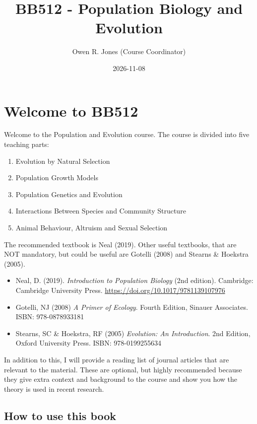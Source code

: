 \documentclass[
  a4paper]{book}
\title{BB512 - Population Biology and Evolution}
\author{Owen R. Jones (Course Coordinator)}
\date{2026-11-08}
\providecommand{\tightlist}{%
  \setlength{\itemsep}{0pt}\setlength{\parskip}{0pt}}
\begin{document}
\maketitle

{
\setcounter{tocdepth}{1}
\tableofcontents
}
\chapter{Welcome to BB512}\label{welcome-to-bb512}

Welcome to the Population and Evolution course.
The course is divided into five teaching parts:

\begin{enumerate}
\def\labelenumi{\arabic{enumi}.}
\tightlist
\item
  Evolution by Natural Selection
\item
  Population Growth Models
\item
  Population Genetics and Evolution
\item
  Interactions Between Species and Community Structure
\item
  Animal Behaviour, Altruism and Sexual Selection
\end{enumerate}

The recommended textbook is Neal (2019). Other useful textbooks, that are NOT mandatory, but could be useful are Gotelli (2008) and Stearns \& Hoekstra (2005).

\begin{itemize}
\tightlist
\item
  Neal, D. (2019). \emph{Introduction to Population Biology} (2nd edition). Cambridge: Cambridge University Press. \url{https://doi.org/10.1017/9781139107976}
\item
  Gotelli, NJ (2008) \emph{A Primer of Ecology}. Fourth Edition, Sinauer Associates. ISBN: 978-0878933181
\item
  Stearns, SC \& Hoekstra, RF (2005) \emph{Evolution: An Introduction}. 2nd Edition, Oxford University Press. ISBN: 978-0199255634
\end{itemize}

In addition to this, I will provide a reading list of journal articles that are relevant to the material. These are optional, but highly recommended because they give extra context and background to the course and show you how the theory is used in recent research.

\section{How to use this book}\label{how-to-use-this-book}
\end{document}
